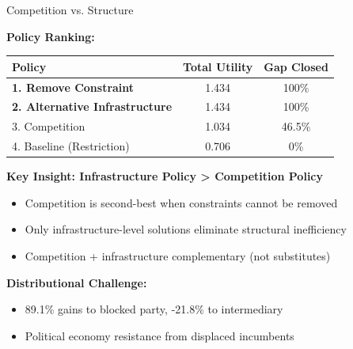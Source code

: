 \documentclass[aspectratio=169]{beamer}
\begin{document}
\begin{frame}{Competition vs. Structure}
    
    \textbf{Policy Ranking:}
    
    \vspace{0.3cm}
    \begin{table}
        \centering
        \small
        \begin{tabular}{lcc}
            \toprule
            \textbf{Policy} & \textbf{Total Utility} & \textbf{Gap Closed} \\
            \midrule
            \textcolor{SafeGreen}{\textbf{1. Remove Constraint}} & 1.434 & 100\%  \\
            \textcolor{SafeGreen}{\textbf{2. Alternative Infrastructure}} & 1.434 & 100\%  \\
            \textcolor{OrangeAccent}{3. Competition} & 1.034 & 46.5\%  \\
            \textcolor{AlertRed}{4. Baseline (Restriction)} & 0.706 & 0\% \\
            \bottomrule
        \end{tabular}
    \end{table}
    
    \vspace{0.1cm}
    \textbf{Key Insight: Infrastructure Policy > Competition Policy}
    \begin{itemize}
        \item Competition is second-best when constraints cannot be removed
        \item Only infrastructure-level solutions eliminate structural inefficiency
        \item Competition + infrastructure complementary (not substitutes)
    \end{itemize}
    
    \vspace{0.1cm}
    \textbf{Distributional Challenge:}
    \begin{itemize}
        \item 89.1\% gains to blocked party, -21.8\% to intermediary
        \item Political economy resistance from displaced incumbents
    \end{itemize}

\end{frame}
\end{document}
